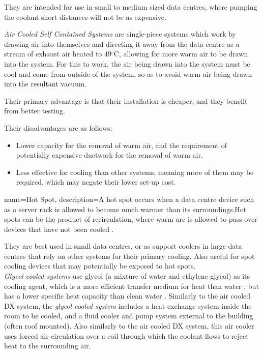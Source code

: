 They are intended for use in small to medium sized data centres, where pumping the coolant short distances will not be as expensive.
  
\emph{Air Cooled Self Contained Systems} are single-piece systems which work by drawing air into themselves and directing it away from the \gls{data centre} as a stream of exhaust air heated to 49$^{\circ}$C, allowing for more warm air to be drawn into the system. For this to work, the air being drawn into the system must be cool and come from outside of the system, so as  to avoid warm air being drawn into the resultant vacuum\cite[Air cooled self-contained systems (1-piece)]{ TonyEvansTheDifferentTypesOfAirConditioningEquipmentForITEnvironmentsWhitePaper}.

Their primary advantage is that their installation is cheaper, and they benefit from better testing.

Their disadvantages are as follows:
\begin{itemize}
   \item Lower capacity for the removal of warm air, and the requirement of potentially expensive ductwork for the removal of warm air. 
   \item Less effective for cooling than other systems, meaning more of them may be required, which may negate their lower set-up cost.
\end{itemize} 

{
  name=Hot Spot,
  description={A hot spot occurs when a data centre device such as a server rack is
  allowed to become much warmer than its surroundings.Hot spots can be the
  product of recirculation, where warm are is allowed to pass over devices that
  have not been cooled \cite{BanuelosManagingDataCentreHeatIssues}.}
}

They are best used in small data centres, or as support coolers in large \gls{data centre}s that rely on other systems for their primary cooling. Also useful for spot cooling devices that may potentially be exposed to \gls{hot spot}s.\\
 
\emph{Glycol cooled systems} use glycol (a mixture of water and ethylene glycol) as its cooling agent, which is a more efficient transfer medium for heat than water \cite{TonyEvansTheDifferentTypesOfAirConditioningEquipmentForITEnvironmentsWhitePaper}, but has a lower specific heat capacity than clean water \cite{EngineeringToolBoxEthyleneGlycolHeatTransferFluid}. Similarly to the air cooled DX system, the \emph{glycol cooled system} includes a heat exchange system inside the room to be cooled, and a fluid cooler and pump system external to the building (often roof mounted). Also similarly to the air cooled DX system, this air cooler uses forced air circulation over a coil through which the coolant flows to reject heat to the surrounding air. 

